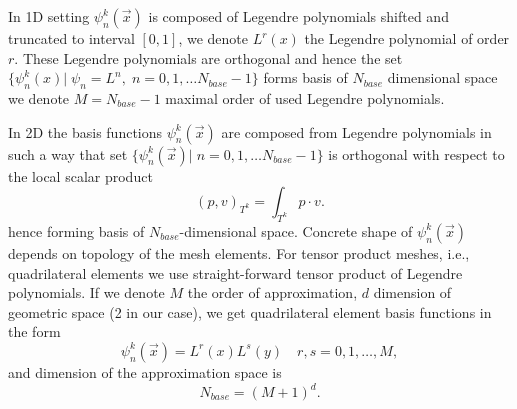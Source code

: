 In 1D setting $\psi_n^k(\vec{x})$ is composed of Legendre polynomials shifted 
and truncated to interval $[0, 1]$, we denote $L^r(x)$ the Legendre 
polynomial of order $r$. These Legendre polynomials are orthogonal and hence 
the set  $\{\psi_n^k(x)| \; \psi_n = L^n, \; n = 0,1, \dots  N_{base} - 
1\}$ forms basis of  $N_{base}$ dimensional space we denote $M = N_{base} - 
1$ maximal order of used Legendre polynomials.

In 2D the basis functions $\psi_n^k(\vec{x})$ are composed from Legendre 
polynomials  in such a way that set $\{\psi_n^k(\vec{x})| \; n = 0,1, \dots  
N_{base} - 1\}$ is orthogonal with respect to the local 
scalar product
\begin{equation}
\label{eq:scalar_prod_dk}
(p, v)_{T^k} = \int_{T^k} p \cdot v.
\end{equation}
hence forming basis of $N_{base}$-dimensional space. Concrete shape of 
$\psi_n^k(\vec{x})$ depends on topology of the mesh elements. For 
tensor product meshes, i.e., quadrilateral elements we use straight-forward 
tensor product of Legendre polynomials. If we denote $M$ the order of 
approximation, $d$ dimension of geometric space (2 in our case), we get 
quadrilateral element basis functions in the form
\begin{equation}
\psi_n^k(\vec{x}) = L^r(x)L^s(y)\quad r, s = 0,1, \dots, M,
\end{equation}
and dimension of the approximation space is
\begin{equation}
N_{base} = (M + 1)^d.
\end{equation}

